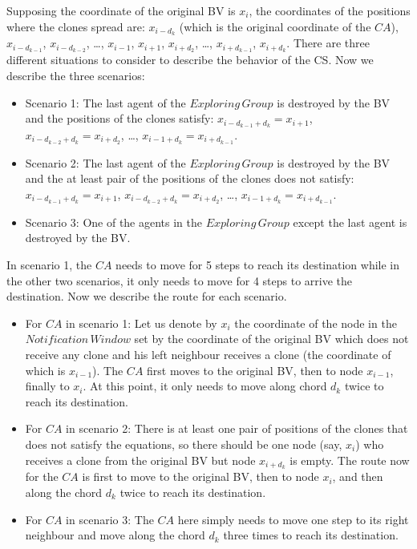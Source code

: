 Supposing the coordinate of the original BV is $x_i$, the coordinates of the positions where the clones spread are: $x_{i-d_k}$ (which is the original coordinate of the $CA$), $x_{i-d_{k-1}}$, $x_{i-d_{k-2}}$, \ldots, $x_{i-1}$, $x_{i+1}$, $x_{i+d_2}$, \ldots, $x_{i+d_{k-1}}$, $x_{i+d_{k}}$. There are three different situations to consider to describe the behavior of the CS.  
Now we describe the  three scenarios:
\begin{itemize}
\item Scenario 1: The last agent of the $Exploring\,Group$ is destroyed by the BV and the positions of the clones satisfy: $x_{i-d_{k-1}+d_{k}}=x_{i+1}$, $x_{i-d_{k-2}+d_{k}}=x_{i+d_2}$, \ldots, $x_{{i-1}+d_{k}}=x_{i+d_{k-1}}$. 
\item Scenario 2: The last agent of the $Exploring\,Group$ is destroyed by the BV and the at least   pair of the positions of the clones does not satisfy: $x_{i-d_{k-1}+d_{k}}=x_{i+1}$, $x_{i-d_{k-2}+d_{k}}=x_{i+d_2}$, \ldots, $x_{{i-1}+d_{k}}=x_{i+d_{k-1}}$. 
\item Scenario 3: One of the agents in the $Exploring\,Group$ except the last agent is destroyed by the BV.
\end{itemize}

In scenario 1, the $CA$ needs to move for 5 steps to reach its destination while in the other two scenarios, it only needs to move for 4 steps to arrive the destination. Now we describe the route for each scenario.
\begin{itemize}
\item For $CA$ in scenario 1: Let us denote by $x_i$ the coordinate of the node in the $Notification\,Window$ set by the coordinate of the original BV which does not receive any clone and his left neighbour receives a clone (the coordinate of which is $x_{i-1}$). The $CA$ first moves to the original BV, then to node $x_{i-1}$, finally to $x_i$. At this point, it only needs to move along   chord $d_k$   twice to reach its destination.
\item For $CA$ in scenario 2: There is at least one pair of   positions of the clones that does not satisfy the equations, so there should be one node (say, $x_i$) who receives a clone from the original BV but node $x_{i+d_k}$ is empty. The route now for the $CA$ is first to move to the original BV, then to node $x_i$, and then   along the chord $d_k$   twice to reach its destination.
\item For $CA$ in scenario 3: The $CA$ here simply needs to move   one step to its right neighbour and move along the chord $d_k$   three times to reach its destination.
\end{itemize}

